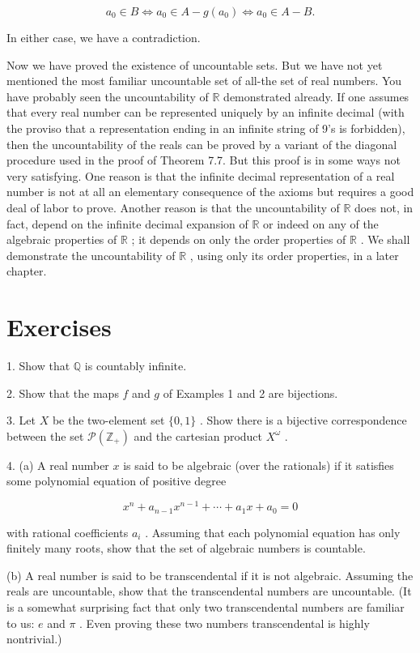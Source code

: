 \documentclass[10pt]{article}
\begin{document}
\[
{a}_{0} \in  B \Leftrightarrow  {a}_{0} \in  A - g\left( {a}_{0}\right)  \Leftrightarrow  {a}_{0} \in  A - B.
\]

In either case, we have a contradiction.

Now we have proved the existence of uncountable sets. But we have not yet mentioned the most familiar uncountable set of all-the set of real numbers. You have probably seen the uncountability of \(\mathbb{R}\) demonstrated already. If one assumes that every real number can be represented uniquely by an infinite decimal (with the proviso that a representation ending in an infinite string of 9's is forbidden), then the uncountability of the reals can be proved by a variant of the diagonal procedure used in the proof of Theorem 7.7. But this proof is in some ways not very satisfying. One reason is that the infinite decimal representation of a real number is not at all an elementary consequence of the axioms but requires a good deal of labor to prove. Another reason is that the uncountability of \(\mathbb{R}\) does not, in fact, depend on the infinite decimal expansion of \(\mathbb{R}\) or indeed on any of the algebraic properties of \(\mathbb{R}\) ; it depends on only the order properties of \(\mathbb{R}\) . We shall demonstrate the uncountability of \(\mathbb{R}\) , using only its order properties, in a later chapter.

\section*{Exercises}

1. Show that \(\mathbb{Q}\) is countably infinite.

2. Show that the maps \(f\) and \(g\) of Examples 1 and 2 are bijections.

3. Let \(X\) be the two-element set \(\{ 0,1\}\) . Show there is a bijective correspondence between the set \(\mathcal{P}\left( {\mathbb{Z}}_{ + }\right)\) and the cartesian product \({X}^{\omega }\) .

4. (a) A real number \(x\) is said to be algebraic (over the rationals) if it satisfies some polynomial equation of positive degree

\[
{x}^{n} + {a}_{n - 1}{x}^{n - 1} + \cdots  + {a}_{1}x + {a}_{0} = 0
\]

with rational coefficients \({a}_{i}\) . Assuming that each polynomial equation has only finitely many roots, show that the set of algebraic numbers is countable.

(b) A real number is said to be transcendental if it is not algebraic. Assuming the reals are uncountable, show that the transcendental numbers are uncountable. (It is a somewhat surprising fact that only two transcendental numbers are familiar to us: \(e\) and \(\pi\) . Even proving these two numbers transcendental is highly nontrivial.)
\end{document}
